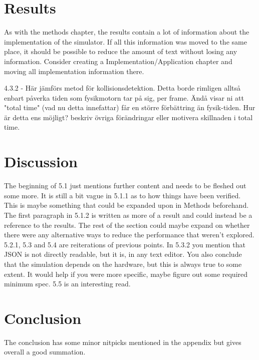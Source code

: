\documentclass[12pt,a4paper,twoside,openright]{report}
\begin{document}
\section*{Results}

	As with the methods chapter, the results contain a lot of information about
	the implementation of the simulator. If all this information was moved to
	the same place, it should be possible to reduce the amount of text without
	losing any information. Consider creating a Implementation/Application 
	chapter and moving all implementation information there.
	
	4.3.2 - Här jämförs metod för kollisionsdetektion. Detta borde rimligen 
	alltså enbart påverka tiden som fysikmotorn tar på sig, per frame. Ändå 
	visar ni att "total time" (vad nu detta innefattar) får en större 
	förbättring än fysik-tiden. Hur är detta ens möjligt? beskriv övriga 
	förändringar eller motivera skillnaden i total time.


\section*{Discussion}

	The beginning of 5.1 just mentions further content and needs to be fleshed 
	out	some more. It is still a bit vague in 5.1.1 as to how things have been
	verified. This is maybe something that could be expanded upon in Methods
	beforehand. The first paragraph in 5.1.2 is written as more of a result and
	could instead be a reference to the results. The rest of the section could
	maybe expand on whether there were any alternative ways to reduce the
	performance that weren't explored. 5.2.1, 5.3 and 5.4 are reiterations of
	previous points. In 5.3.2 you mention that JSON is not directly readable, 
	but it is, in any text editor. You also conclude that the simulation 
	depends on the hardware, but this is always true to some extent. It would 
	help if you were more specific, maybe figure out some required minimum 
	spec. 5.5 is an interesting read.

\section*{Conclusion}

	The conclusion has some minor nitpicks mentioned in the appendix but gives
	overall a good summation.
\end{document}
